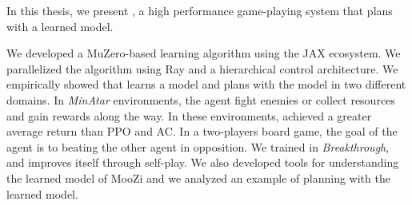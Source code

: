 In this thesis, we present \moozi, a high performance game-playing system that plans with a learned model.

We developed a MuZero-based learning algorithm using the JAX ecosystem.
We parallelized the algorithm using Ray and a hierarchical control architecture.
We empirically showed that \moozi learns a model and plans with the model in two different domains.
In \textit{MinAtar} environments, the agent fight enemies or collect resources and gain rewards along the way.
In these environments, \moozi achieved a greater average return than PPO and AC.
In a two-players board game, the goal of the agent is to beating the other agent in opposition.
We trained \moozi in \textit{Breakthrough}, and \moozi improves itself through self-play.
We also developed tools for understanding the learned model of MooZi and we analyzed an example of \moozi planning with the learned model.  

